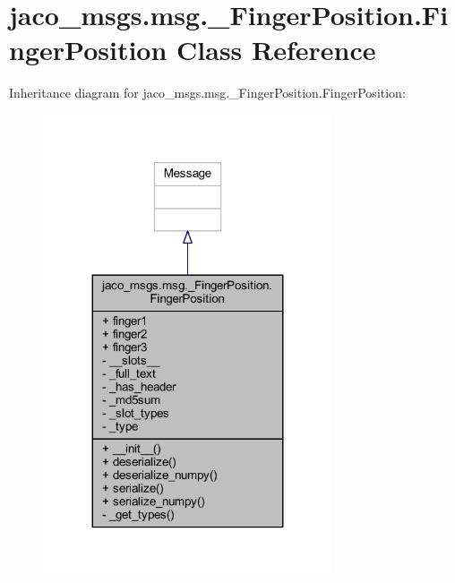 \hypertarget{classjaco__msgs_1_1msg_1_1__FingerPosition_1_1FingerPosition}{}\section{jaco\+\_\+msgs.\+msg.\+\_\+\+Finger\+Position.\+Finger\+Position Class Reference}
\label{classjaco__msgs_1_1msg_1_1__FingerPosition_1_1FingerPosition}


Inheritance diagram for jaco\+\_\+msgs.\+msg.\+\_\+\+Finger\+Position.\+Finger\+Position\+:
\nopagebreak
\begin{figure}[H]
\begin{center}
\leavevmode
\includegraphics[width=239pt]{da/df7/classjaco__msgs_1_1msg_1_1__FingerPosition_1_1FingerPosition__inherit__graph}
\end{center}
\end{figure}


